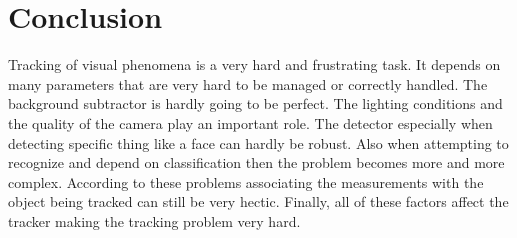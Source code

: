 \section{Conclusion}

Tracking of visual phenomena is a very hard and frustrating task. It depends on many parameters that are very hard to be managed or correctly handled. The background subtractor is hardly going to be perfect. The lighting conditions and the quality of the camera play an important role. The detector especially when detecting specific thing like a face can hardly be robust. Also when attempting to recognize and depend on classification then the problem becomes more and more complex. According to these problems associating the measurements with the object being tracked can still be very hectic. Finally, all of these factors affect the tracker making the tracking problem very hard.